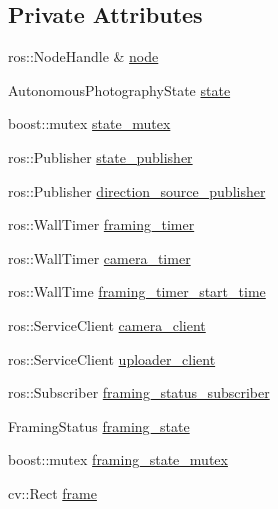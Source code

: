 \subsection*{\-Private \-Attributes}
\begin{DoxyCompactItemize}
\item 
ros\-::\-Node\-Handle \& \hyperlink{class_r_p_autonomous_photography_node_a76b5869d4c60b361445d78995569a0fa}{node}
\item 
\-Autonomous\-Photography\-State \hyperlink{class_r_p_autonomous_photography_node_ac089c5ccbee966592436a2975b8a2403}{state}
\item 
boost\-::mutex \hyperlink{class_r_p_autonomous_photography_node_af419f69958f392bea348dbd05bc8d401}{state\-\_\-mutex}
\item 
ros\-::\-Publisher \hyperlink{class_r_p_autonomous_photography_node_a562382a07e7c13dd0386e310979f54a5}{state\-\_\-publisher}
\item 
ros\-::\-Publisher \hyperlink{class_r_p_autonomous_photography_node_afa3919a478867fdc881ca978e10a2e24}{direction\-\_\-source\-\_\-publisher}
\item 
ros\-::\-Wall\-Timer \hyperlink{class_r_p_autonomous_photography_node_a91e869e881e77d50e9664fdc21809ed7}{framing\-\_\-timer}
\item 
ros\-::\-Wall\-Timer \hyperlink{class_r_p_autonomous_photography_node_abc5765930ab927f9046f77749c8c0e21}{camera\-\_\-timer}
\item 
ros\-::\-Wall\-Time \hyperlink{class_r_p_autonomous_photography_node_ae8ce7f1f61fbbcbfd1d92eeccfe8c214}{framing\-\_\-timer\-\_\-start\-\_\-time}
\item 
ros\-::\-Service\-Client \hyperlink{class_r_p_autonomous_photography_node_aeb6c71c4b1f44d56d3ef4a523c33c677}{camera\-\_\-client}
\item 
ros\-::\-Service\-Client \hyperlink{class_r_p_autonomous_photography_node_aaca249845b8cd8c5376fdb8d5ff3f544}{uploader\-\_\-client}
\item 
ros\-::\-Subscriber \hyperlink{class_r_p_autonomous_photography_node_a2a2bdd2d12fafa13bcb66b8f37279bcd}{framing\-\_\-status\-\_\-subscriber}
\item 
\-Framing\-Status \hyperlink{class_r_p_autonomous_photography_node_a8109c74e907e283cb06e66b4e9f3591f}{framing\-\_\-state}
\item 
boost\-::mutex \hyperlink{class_r_p_autonomous_photography_node_a52a7a8c95eff1f589091f679f3d57492}{framing\-\_\-state\-\_\-mutex}
\item 
cv\-::\-Rect \hyperlink{class_r_p_autonomous_photography_node_a796dec0abe6fc1728bd9577c2cea2116}{frame}

\end{DoxyCompactItemize}
